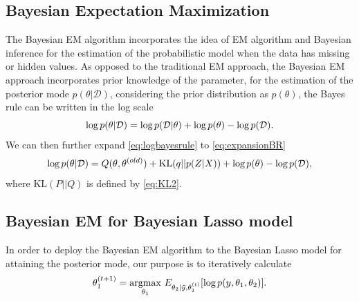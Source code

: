\subsection{Bayesian Expectation Maximization}
The Bayesian EM algorithm incorporates the idea of EM algorithm and Bayesian inference for the estimation of the probabilistic model when the data has missing or hidden values. As opposed to the traditional EM approach, the Bayesian EM approach incorporates prior knowledge of the parameter, for the estimation of the posterior mode $p(\theta|\mathcal{D})$, considering the prior distribution as $p(\theta)$, the Bayes rule can be written in the log scale
\begin{equation}
	\label{eq:logbayesrule}
	\textnormal{log}\, p(\theta|\mathcal{D}) = \textnormal{log}\,p(\mathcal{D}|\theta) + \textnormal{log}\, p(\theta) - \textnormal{log}\,p(\mathcal{D}).
\end{equation}
We can then further expand \autoref{eq:logbayesrule} to \autoref{eq:expansionBR}
\begin{equation}
	\label{eq:expansionBR}
	\textnormal{log}\, p(\theta|\mathcal{D}) = Q(\theta,\theta^{(old)}) + \textnormal{KL}(q||p(Z|X)) + \textnormal{log}\,p(\theta) - \textnormal{log}\,p(\mathcal{D}),
\end{equation}
where KL$(P||Q)$ is defined by \autoref{eq:KL2}.
\subsection{Bayesian EM for Bayesian Lasso model}
In order to deploy the Bayesian EM algorithm to the Bayesian Lasso model for attaining the posterior mode, our purpose is to iteratively calculate 
$$
	\theta_1^{(t+1)} = \operatorname*{argmax}_{\theta_1}\, E_{\theta_2|\tilde{y},\theta_1^{(t)}}[\textnormal{log}\,p(y,\theta_1,\theta_2)].
$$
